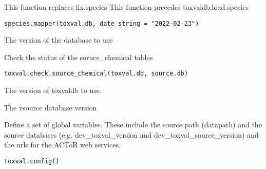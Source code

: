 \documentclass[letterpaper]{book}
\begin{document}
%
\begin{Description}\relax
This function replaces fix.species
This function precedes toxvaldb.load.species
\end{Description}
%
\begin{Usage}
\begin{verbatim}
species.mapper(toxval.db, date_string = "2022-02-23")
\end{verbatim}
\end{Usage}
%
\begin{Arguments}
\begin{ldescription}
\item[\code{toxval.db}] The version of the database to use
\end{ldescription}
\end{Arguments}
%
\begin{Description}\relax
Check the status of the soruce\_chemical tables
\end{Description}
%
\begin{Usage}
\begin{verbatim}
toxval.check.source_chemical(toxval.db, source.db)
\end{verbatim}
\end{Usage}
%
\begin{Arguments}
\begin{ldescription}
\item[\code{toxval.db}] The version of toxvaldb to use.

\item[\code{source.db}] The vsource database version
\end{ldescription}
\end{Arguments}
%
\begin{Description}\relax
Define a set of global variables. These include the source path (datapath)
and the source databases (e.g. dev\_toxval\_version and dev\_toxval\_source\_version)
and the urls for the ACToR web services.
\end{Description}
%
\begin{Usage}
\begin{verbatim}
toxval.config()
\end{verbatim}
\end{Usage}
\end{document}
